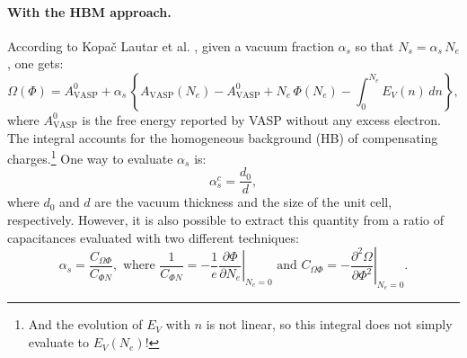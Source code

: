 \documentclass[12pt,a4paper]{article}
\begin{document}
	\paragraph{With the HBM approach.} According to Kopa{\v c} Lautar et al. \cite{kopaclautarModelingInterfacialElectrochemistry2020}, given a vacuum fraction $\alpha_s$ so that $N_s = \alpha_s\,N_e$, one gets:\begin{equation}
		\Omega(\Phi) =  A_{\text{VASP}}^0 + \alpha_s\,\left\{A_{\text{VASP}}(N_e)-A_{\text{VASP}}^0+ N_e\,\Phi(N_e)-\int_0^{N_e} E_V(n)\,dn\right\}, \label{eq:gdp-hbm}
	\end{equation}
	where $A_{\text{VASP}}^0$ is the free energy reported by VASP without any excess electron. The integral accounts for the homogeneous background (HB) of compensating charges.\footnote{And the evolution of $E_V$ with $n$ is not linear, so this integral does not simply evaluate to $E_V(N_e)$!} One way to evaluate $\alpha_s$ is:\begin{equation*}
		\alpha_s^c = \frac{d_0}{d},
	\end{equation*}
	where $d_0$ and $d$ are the vacuum thickness and the size of the unit cell, respectively. However, it is also possible to extract this quantity from a ratio of capacitances evaluated with two different techniques: \cite{hagopianAdvancementHomogeneousBackground2022}\begin{equation*}
		\alpha_s = \frac{C_{\Omega\Phi}}{C_{\Phi N}}, \text{ where }  \frac{1}{C_{\Phi N}} = \left.-\frac{1}{e}\frac{\partial\Phi}{\partial N_e}\right|_{N_e=0} \text{ and } C_{\Omega\Phi} = \left.-\frac{\partial^2\Omega}{\partial\Phi^2}\right|_{N_e=0}.
	\end{equation*}
	
	
	
\end{document}
